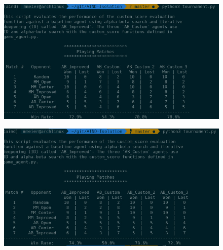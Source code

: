 \documentclass[10pt,a4paper]{article}
\begin{document}
\begin{figure}
\includegraphics[scale=0.5]{image2.jpg}
\end{figure}

\begin{figure}
\includegraphics[scale=0.5]{image3.jpg}
\end{figure}
\end{document}
